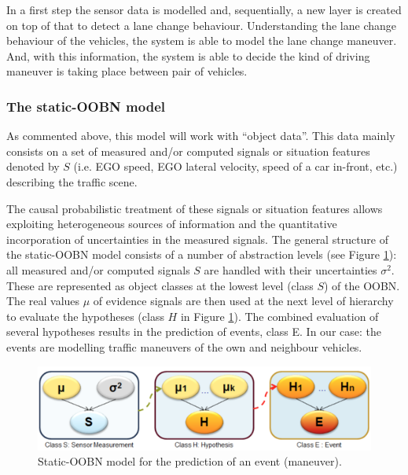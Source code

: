 In a first step the sensor data is modelled and, sequentially,  a new layer is created on top of that to detect a lane change behaviour. Understanding the lane change behaviour of the vehicles, the system is able to model the lane change maneuver. And, with this information, the system is able to decide the kind of driving maneuver is taking place between pair of vehicles. 



\subsubsection*{The static-OOBN model}

As commented above, this model will work with ``object data''. This data mainly consists on a set of measured and/or computed signals or situation features denoted by $S$ (i.e. EGO speed, EGO lateral velocity, speed of a car in-front, etc.)  describing the traffic scene. 

The causal probabilistic treatment of these signals or situation features allows exploiting heterogeneous sources of information and the quantitative incorporation of uncertainties in the measured signals. The general structure of the static-OOBN model consists of a number of abstraction levels (see Figure \ref{Figure:DaimlerOOBNAbstraction}): all measured and/or computed signals $S$ are handled with their uncertainties $\sigma^2$. These are represented as object classes at the lowest level (class $S$) of the OOBN. The real values $\mu$ of evidence signals are then used at the next level of hierarchy to evaluate the hypotheses (class $H$ in Figure \ref{Figure:DaimlerOOBNAbstraction}). The combined evaluation of several hypotheses results in the prediction of events, class E. In our case: the events are modelling traffic maneuvers of the own and neighbour vehicles.

\begin{figure}
\begin{center}
\includegraphics[scale=0.35]{./figures/DaimlerOOBNAbstraction}
\caption{\label{Figure:DaimlerOOBNAbstraction} Static-OOBN model for the prediction of an event (maneuver).}
\end{center}
\end{figure}

